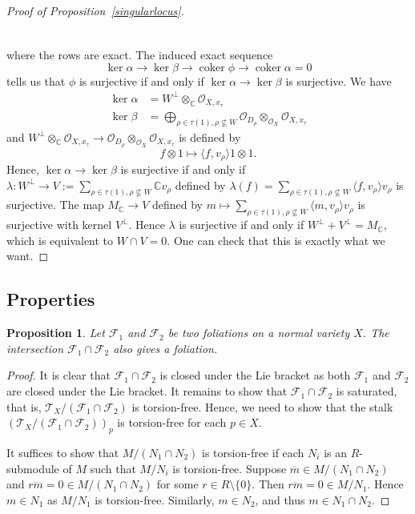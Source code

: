 \documentclass[12pt,reqno]{amsart}
\newtheorem{proposition}[theorem]{Proposition}
\theoremstyle{definition}
\newcommand{\mc}{\mathcal}
\newcommand{\mb}{\mathbb}
\newcommand{\on}{\operatorname}
\newcommand\cF{{\mathcal{F}}}
\newcommand\cO{{\mathcal{O}}}
\newcommand\cT{{\mathcal{T}}}
\newcommand\bC{{\mathbb C}}
\begin{document}
\begin{proof}[{Proof of Proposition~\ref{singularlocus}}]
\[\begin{tikzcd}
    \end{tikzcd}
    \]
    where the rows are exact. The induced exact sequence
    \[
    \ker\alpha\rightarrow \ker\beta\rightarrow \on{coker}\phi\rightarrow \on{coker}\alpha=0
    \]
    tells us that $\phi$ is surjective if and only if $\ker\alpha\rightarrow \ker\beta$ is surjective. 
    We have 
    \begin{align*}
        \ker\alpha &= W^{\perp}\otimes_{\bC}\cO_{X,x_\tau} \\
        \ker\beta &= \bigoplus_{\rho\in\tau(1),\rho\nsubseteq W}\cO_{D_\rho}\otimes_{\cO_X}\cO_{X,x_\tau}
    \end{align*}
    and $W^{\perp}\otimes_{\mb C}\mc O_{X,x_\tau}\rightarrow \mc O_{D_\rho}\otimes_{\mc O_X}\mc O_{X,x_\tau}$ is defined by
    \[
    f\otimes 1\mapsto \langle f,v_\rho \rangle 1\otimes 1.
    \]
    Hence, $\ker\alpha\rightarrow\ker\beta$ is surjective if and only if $\lambda\colon W^\perp \rightarrow V:=\sum_{\rho\in\tau(1),\rho\nsubseteq W} \mb C v_\rho$ defined by $\lambda(f)= \sum_{\rho\in\tau(1),\rho\nsubseteq W}\langle f,v_\rho\rangle v_\rho$ is surjective. 
    The map $M_\mb C\rightarrow V$ defined by $m\mapsto \sum_{\rho\in\tau(1),\rho\nsubseteq W}\langle m,v_\rho\rangle v_\rho$ is surjective with kernel $V^\perp$. Hence $\lambda$ is surjective if and only if $W^\perp+V^\perp=M_\mb C$, which is equivalent to $W\cap V=0$. One can check that this is exactly what we want.
\end{proof}

\subsection{Properties}
\begin{proposition}
    Let $\cF_1$ and $\cF_2$ be two foliations on a normal variety $X$. 
    The intersection $\cF_1\cap\cF_2$ also gives a foliation. 
\end{proposition}
\begin{proof}
    It is clear that $\cF_1\cap\cF_2$ is closed under the Lie bracket as both $\cF_1$ and $\cF_2$ are closed under the Lie bracket. 
    It remains to show that $\cF_1\cap\cF_2$ is saturated, that is, $\cT_X/(\cF_1\cap\cF_2)$ is torsion-free. Hence, we need to show that  
    the stalk $(\cT_X/(\cF_1\cap\cF_2))_p$ is torsion-free for each $p\in X$. 
    
    It suffices to show that $M/(N_1\cap N_2)$ is torsion-free if each $N_i$
    is an $R$-submodule of $M$ such that $M/N_i$ is torsion-free.
    Suppose $\overline{m}\in M/(N_1\cap N_2)$ and $\overline{rm}=0\in M/(N_1\cap N_2)$ for some $r\in R\setminus\{0\}$. Then $\overline{rm}=0\in M/N_1$. Hence $m\in N_1$ as $M/N_1$ is torsion-free. Similarly, $m\in N_2$, and thus $m\in N_1\cap N_2$.
\end{proof}
\end{document}
